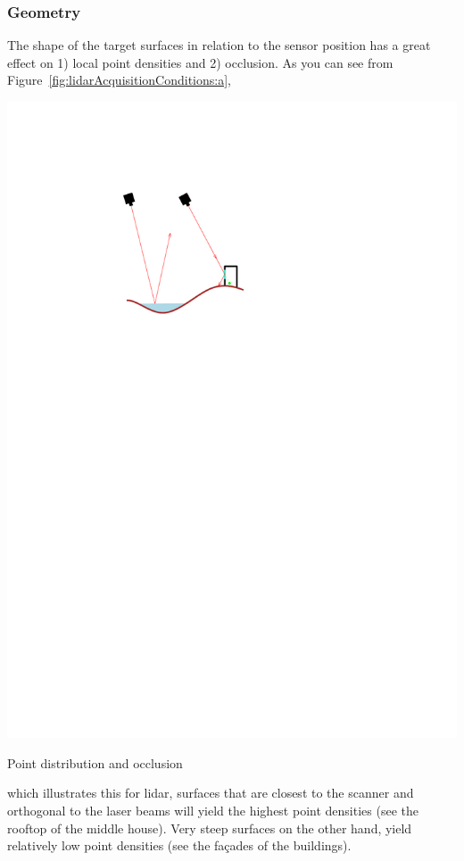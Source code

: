 \subsubsection{Geometry} 
The shape of the target surfaces in relation to the sensor position has a great effect on 1) local point densities and 2) occlusion. As you can see from Figure~\ref{fig:lidarAcquisitionConditions:a},
\begin{marginfigure}
	\centering
	\includegraphics[width=\textwidth,page=2]{figs/lidarAcq.pdf}
	\caption{Point distribution and occlusion}%
	\label{fig:lidarAcquisitionConditions:a}
\end{marginfigure}
which illustrates this for lidar, surfaces that are closest to the scanner and orthogonal to the laser beams will yield the highest point densities (see the rooftop of the middle house). Very steep surfaces on the other hand, yield relatively low point densities (see the façades of the buildings). 

